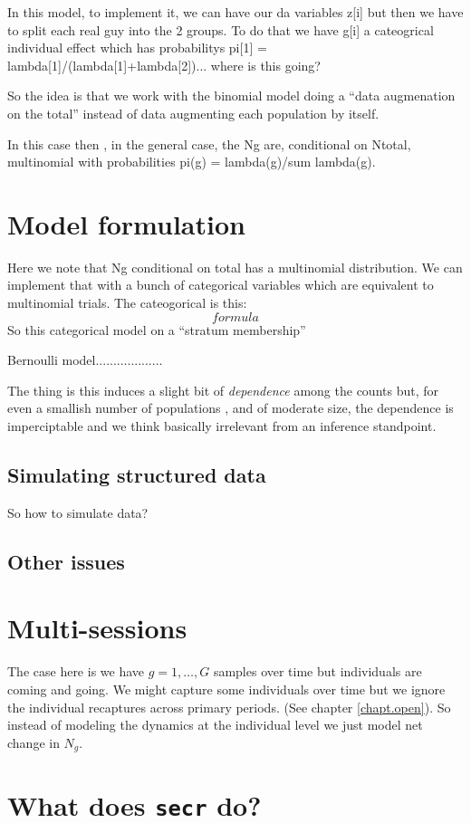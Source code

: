 In this model, to implement it, we can have our da variables z[i] but
then we have to split each real guy into the 2 groups. To do that we
have g[i] a cateogrical individual effect which has probabilitys
pi[1] = lambda[1]/(lambda[1]+lambda[2])... where is this going?



So the idea is that we work with the binomial model doing a 
``data augmenation on the total'' instead of data augmenting each
population by itself. 

In this case then , in the general case, the Ng are, conditional on
Ntotal, multinomial with probabilities pi(g) = lambda(g)/sum lambda(g).



\section{Model formulation}

Here we note that Ng conditional on total has a multinomial
distribution. We can implement that with a bunch of categorical
variables which are equivalent to multinomial trials.  The
cateogorical is this:
\[
formula
\]
So this categorical model on a ``stratum membership''

Bernoulli model...................


The thing is this induces a slight bit of {\it dependence} among the
counts but, for even a smallish number of populations , and of
moderate size, the dependence is imperciptable and we think basically
irrelevant from an inference standpoint. 

\subsection{Simulating structured data}

So how to simulate data?


\subsection{Other issues}


\section{Multi-sessions}

The case here is we have $g=1,\ldots,G$ samples over time but
individuals are coming and going.
We might capture some individuals over time but we ignore the
individual recaptures across primary periods. (See chapter
\ref{chapt.open}). So instead of modeling the dynamics at the individual
level we just model net change in $N_{g}$.


\section{What does \mbox{\tt secr} do?}



